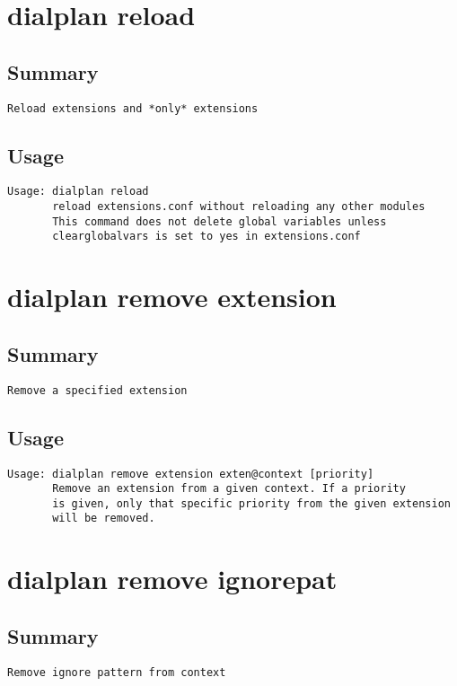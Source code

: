 \section{dialplan reload}
\subsection{Summary}
\begin{verbatim}
Reload extensions and *only* extensions
\end{verbatim}
\subsection{Usage}
\begin{verbatim}
Usage: dialplan reload
       reload extensions.conf without reloading any other modules
       This command does not delete global variables unless
       clearglobalvars is set to yes in extensions.conf

\end{verbatim}


\section{dialplan remove extension}
\subsection{Summary}
\begin{verbatim}
Remove a specified extension
\end{verbatim}
\subsection{Usage}
\begin{verbatim}
Usage: dialplan remove extension exten@context [priority]
       Remove an extension from a given context. If a priority
       is given, only that specific priority from the given extension
       will be removed.

\end{verbatim}


\section{dialplan remove ignorepat}
\subsection{Summary}
\begin{verbatim}
Remove ignore pattern from context
\end{verbatim}
